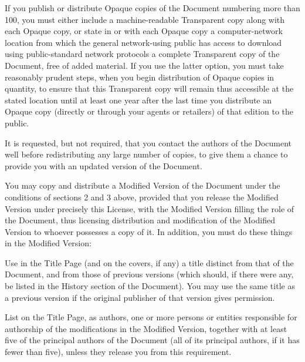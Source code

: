 If you publish or distribute Opaque copies of the Document numbering
more than 100, you must either include a machine-readable Transparent
copy along with each Opaque copy, or state in or with each Opaque copy
a computer-network location from which the general network-using
public has access to download using public-standard network protocols
a complete Transparent copy of the Document, free of added material.
If you use the latter option, you must take reasonably prudent steps,
when you begin distribution of Opaque copies in quantity, to ensure
that this Transparent copy will remain thus accessible at the stated
location until at least one year after the last time you distribute an
Opaque copy (directly or through your agents or retailers) of that
edition to the public.

It is requested, but not required, that you contact the authors of the
Document well before redistributing any large number of copies, to give
them a chance to provide you with an updated version of the Document.


\stopalignment

You may copy and distribute a Modified Version of the Document under
the conditions of sections 2 and 3 above, provided that you release
the Modified Version under precisely this License, with the Modified
Version filling the role of the Document, thus licensing distribution
and modification of the Modified Version to whoever possesses a copy
of it.  In addition, you must do these things in the Modified Version:

\startitemize[A]
\item[A.]
   Use in the Title Page (and on the covers, if any) a title distinct
   from that of the Document, and from those of previous versions
   (which should, if there were any, be listed in the History section
   of the Document).  You may use the same title as a previous version
   if the original publisher of that version gives permission.

\item[B.]
   List on the Title Page, as authors, one or more persons or entities
   responsible for authorship of the modifications in the Modified
   Version, together with at least five of the principal authors of the
   Document (all of its principal authors, if it has fewer than five),
   unless they release you from this requirement.

